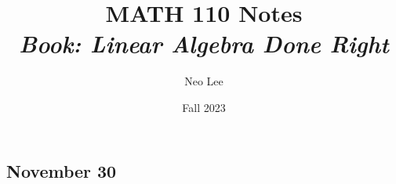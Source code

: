 \documentclass{book}
\title{\Huge{MATH 110 Notes}\\\emph{Book: Linear Algebra Done Right}}
\author{\huge{Neo Lee}}
\date{Fall 2023}
\begin{document}
\maketitle
\let\cleardoublepage\clearpage
{}
\tableofcontents

\chapter{}
\section{November 30}
\end{document}
